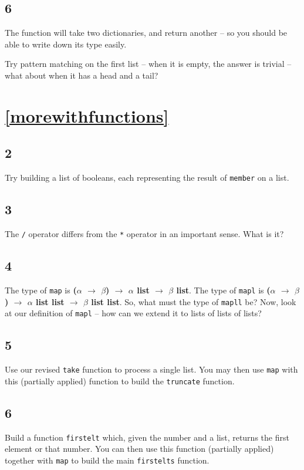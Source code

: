 \documentclass[]{book}
\begin{document}
\subsection*{6}
The function will take two dictionaries, and return another -- so you should be able to write down its type easily.

Try pattern matching on the first list -- when it is empty, the answer is trivial -- what about when it has a head and a tail?

\section*{\ref{morewithfunctions}\\ }

\subsection*{2}
Try building a list of booleans, each representing the result of \texttt{member} on a list.

\subsection*{3}
The \texttt{/} operator differs from the \texttt{*} operator in an important sense. What is it?

\subsection*{4}
The type of \texttt{map} is \textbf{\textrm{\textmd{(}$\alpha$ $\rightarrow$ $\beta$\textmd{)} $\rightarrow$ $\alpha$ list $\rightarrow$ $\beta$ list}}. The type of \texttt{mapl} is \textbf{\textrm{\textmd{(}$\alpha$ $\rightarrow$ $\beta$\textmd{)} $\rightarrow$ $\alpha$ list list $\rightarrow$ $\beta$ list list}}. So, what must the type of \texttt{mapll} be? Now, look at our definition of \texttt{mapl} -- how can we extend it to lists of lists of lists?

\subsection*{5}
Use our revised \texttt{take} function to process a single list. You may then use \texttt{map} with this (partially applied) function to build the \texttt{truncate} function.

\subsection*{6}
Build a function \texttt{firstelt} which, given the number and a list, returns the first element or that number. You can then use this function (partially applied) together with \texttt{map} to build the main \texttt{firstelts} function.
\end{document}
